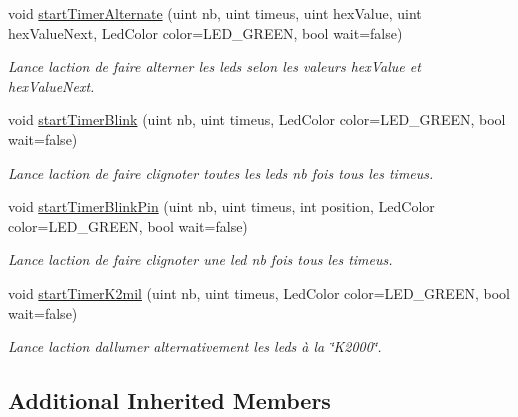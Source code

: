 \begin{DoxyCompactItemize}
\mbox{\label{classLedBar_ac680352e575b6a86e40e0d9143db38d7}} 
void \hyperlink{classLedBar_ac680352e575b6a86e40e0d9143db38d7}{start\+Timer\+Alternate} (uint nb, uint timeus, uint hex\+Value, uint hex\+Value\+Next, Led\+Color color=L\+E\+D\+\_\+\+G\+R\+E\+EN, bool wait=false)
\begin{DoxyCompactList}\small\item\em Lance l\textquotesingle{}action de faire alterner les leds selon les valeurs hex\+Value et hex\+Value\+Next. \end{DoxyCompactList}\item 
\mbox{\label{classLedBar_ac7514d41eb32a1a7a47d742ca4892a50}} 
void \hyperlink{classLedBar_ac7514d41eb32a1a7a47d742ca4892a50}{start\+Timer\+Blink} (uint nb, uint timeus, Led\+Color color=L\+E\+D\+\_\+\+G\+R\+E\+EN, bool wait=false)
\begin{DoxyCompactList}\small\item\em Lance l\textquotesingle{}action de faire clignoter toutes les leds nb fois tous les timeus. \end{DoxyCompactList}\item 
\mbox{\label{classLedBar_a2fb2bd9ec3e7fcb7451cb859db3a6846}} 
void \hyperlink{classLedBar_a2fb2bd9ec3e7fcb7451cb859db3a6846}{start\+Timer\+Blink\+Pin} (uint nb, uint timeus, int position, Led\+Color color=L\+E\+D\+\_\+\+G\+R\+E\+EN, bool wait=false)
\begin{DoxyCompactList}\small\item\em Lance l\textquotesingle{}action de faire clignoter une led nb fois tous les timeus. \end{DoxyCompactList}\item 
\mbox{\label{classLedBar_a4e3205aef3a0d44b623d4f8434235cbb}} 
void \hyperlink{classLedBar_a4e3205aef3a0d44b623d4f8434235cbb}{start\+Timer\+K2mil} (uint nb, uint timeus, Led\+Color color=L\+E\+D\+\_\+\+G\+R\+E\+EN, bool wait=false)
\begin{DoxyCompactList}\small\item\em Lance l\textquotesingle{}action d\textquotesingle{}allumer alternativement les leds à la \char`\"{}\+K2000\char`\"{}. \end{DoxyCompactList}\end{DoxyCompactItemize}
\subsection*{Additional Inherited Members}


